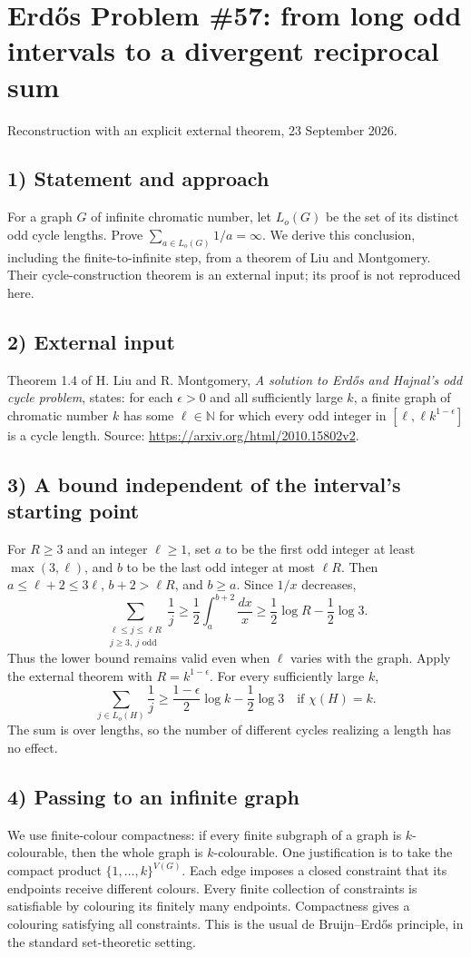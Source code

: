 \section{Erd\H{o}s Problem \#57: from long odd intervals to a divergent reciprocal sum}
\noindent Reconstruction with an explicit external theorem, 23 September 2026.

\subsection*{1) Statement and approach}
For a graph $G$ of infinite chromatic number, let $L_o(G)$ be the set of its distinct odd cycle lengths. Prove $\sum_{a\in L_o(G)}1/a=\infty$. We derive this conclusion, including the finite-to-infinite step, from a theorem of Liu and Montgomery. Their cycle-construction theorem is an external input; its proof is not reproduced here.

\subsection*{2) External input}
Theorem 1.4 of H. Liu and R. Montgomery, \emph{A solution to Erd\H{o}s and Hajnal's odd cycle problem}, states: for each $\epsilon>0$ and all sufficiently large $k$, a finite graph of chromatic number $k$ has some $\ell\in\mathbb N$ for which every odd integer in $[\ell,\ell k^{1-\epsilon}]$ is a cycle length. Source: \url{https://arxiv.org/html/2010.15802v2}.

\subsection*{3) A bound independent of the interval's starting point}
For $R\ge3$ and an integer $\ell\ge1$, set $a$ to be the first odd integer at least $\max(3,\ell)$, and $b$ to be the last odd integer at most $\ell R$. Then $a\le\ell+2\le3\ell$, $b+2>\ell R$, and $b\ge a$. Since $1/x$ decreases,
\[
 \sum_{\substack{\ell\le j\le\ell R\\j\ge3,\ j\text{ odd}}}\frac1j
 \ge\frac12\int_a^{b+2}\frac{dx}{x}
 \ge\frac12\log R-\frac12\log3.\tag{1}
\]
Thus the lower bound remains valid even when $\ell$ varies with the graph. Apply the external theorem with $R=k^{1-\epsilon}$. For every sufficiently large $k$,
\[
 \sum_{j\in L_o(H)}\frac1j
 \ge\frac{1-\epsilon}{2}\log k-\frac12\log3
 \quad\text{if }\chi(H)=k.\tag{2}
\]
The sum is over lengths, so the number of different cycles realizing a length has no effect.

\subsection*{4) Passing to an infinite graph}
We use finite-colour compactness: if every finite subgraph of a graph is $k$-colourable, then the whole graph is $k$-colourable. One justification is to take the compact product $\{1,\ldots,k\}^{V(G)}$. Each edge imposes a closed constraint that its endpoints receive different colours. Every finite collection of constraints is satisfiable by colouring its finitely many endpoints. Compactness gives a colouring satisfying all constraints. This is the usual de Bruijn--Erd\H{o}s principle, in the standard set-theoretic setting.

